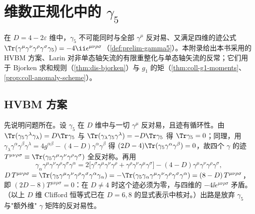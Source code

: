 \chapter{维数正规化中的 $\gamma_5$}\label{app:appI}

在 $D=4-2\varepsilon$ 维中，$\gamma_5$ 不可能同时与全部 $\gamma^\mu$ 反对易、又满足四维的迹公式 $\Tr(\gamma^\mu\gamma^\nu\gamma^\rho\gamma^\sigma\gamma_5)=-4\ii\epsilon^{\mu\nu\rho\sigma}$（\cref{def:prelim-gamma5}）。本附录给出本书采用的 HVBM 方案、Larin 对非单态轴矢流的有限重整化与单态轴矢流的反常；它们用于 Bjorken 求和规则（\cref{thm:dis-bjorken}）与 $g_1$ 的矩（\cref{thm:coll-g1-moments}、\cref{prop:coll-anomaly-scheme}）。

\section{HVBM 方案}\label{sec:appI-hvbm}

先说明问题所在。设 $\gamma_5$ 在 $D$ 维中与一切 $\gamma^\mu$ 反对易，且迹有循环性。由 $\Tr(\gamma_5\gamma^\lambda\gamma_\lambda)=D\Tr\gamma_5$ 与 $\Tr(\gamma_\lambda\gamma_5\gamma^\lambda)=-D\Tr\gamma_5$ 得 $\Tr\gamma_5=0$；同理，用 $\gamma_\lambda\gamma^\alpha\gamma^\beta\gamma^\lambda=4g^{\alpha\beta}-(4-D)\gamma^\alpha\gamma^\beta$ 得 $(2D-4)\Tr(\gamma_5\gamma^\alpha\gamma^\beta)=0$，故四个 $\gamma$ 的迹 $T^{\mu\nu\rho\sigma}\equiv\Tr(\gamma_5\gamma^\mu\gamma^\nu\gamma^\rho\gamma^\sigma)$ 全反对称。再用
\[
\gamma_\alpha\gamma^\mu\gamma^\nu\gamma^\rho\gamma^\sigma\gamma^\alpha=2\big[\gamma^\sigma\gamma^\mu\gamma^\nu\gamma^\rho+\gamma^\rho\gamma^\nu\gamma^\mu\gamma^\sigma\big]-(4-D)\gamma^\mu\gamma^\nu\gamma^\rho\gamma^\sigma ,
\]
$D\,T^{\mu\nu\rho\sigma}=\Tr(\gamma_5\gamma^\mu\gamma^\nu\gamma^\rho\gamma^\sigma\gamma^\alpha\gamma_\alpha)=-\Tr(\gamma_5\gamma_\alpha\gamma^\mu\gamma^\nu\gamma^\rho\gamma^\sigma\gamma^\alpha)=(8-D)\,T^{\mu\nu\rho\sigma}$，即 $(2D-8)T^{\mu\nu\rho\sigma}=0$：在 $D\ne4$ 时这个迹必须为零，与四维的 $-4\ii\epsilon^{\mu\nu\rho\sigma}$ 矛盾。（以上 $D$ 维 Clifford 恒等式已在 $D=6,8$ 的显式表示中核对。）出路是放弃 $\gamma_5$ 与"额外维" $\gamma$ 矩阵的反对易性。

